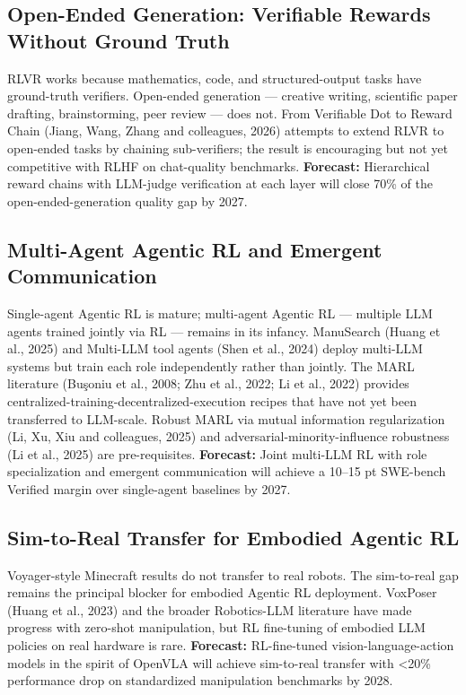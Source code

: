 \subsection{Open-Ended Generation: Verifiable Rewards Without Ground Truth}\label{open-ended-generation-verifiable-rewards-without-ground-truth}

RLVR works because mathematics, code, and structured-output tasks have ground-truth verifiers. Open-ended generation --- creative writing, scientific paper drafting, brainstorming, peer review --- does not. From Verifiable Dot to Reward Chain (Jiang, Wang, Zhang and colleagues, 2026) attempts to extend RLVR to open-ended tasks by chaining sub-verifiers; the result is encouraging but not yet competitive with RLHF on chat-quality benchmarks. \textbf{Forecast:} Hierarchical reward chains with LLM-judge verification at each layer will close 70\% of the open-ended-generation quality gap by 2027.

\subsection{Multi-Agent Agentic RL and Emergent Communication}\label{multi-agent-agentic-rl-and-emergent-communication}

Single-agent Agentic RL is mature; multi-agent Agentic RL --- multiple LLM agents trained jointly via RL --- remains in its infancy. ManuSearch (Huang et al., 2025) and Multi-LLM tool agents (Shen et al., 2024) deploy multi-LLM systems but train each role independently rather than jointly. The MARL literature (Buşoniu et al., 2008; Zhu et al., 2022; Li et al., 2022) provides centralized-training-decentralized-execution recipes that have not yet been transferred to LLM-scale. Robust MARL via mutual information regularization (Li, Xu, Xiu and colleagues, 2025) and adversarial-minority-influence robustness (Li et al., 2025) are pre-requisites. \textbf{Forecast:} Joint multi-LLM RL with role specialization and emergent communication will achieve a 10--15 pt SWE-bench Verified margin over single-agent baselines by 2027.

\subsection{Sim-to-Real Transfer for Embodied Agentic RL}\label{sim-to-real-transfer-for-embodied-agentic-rl}

Voyager-style Minecraft results do not transfer to real robots. The sim-to-real gap remains the principal blocker for embodied Agentic RL deployment. VoxPoser (Huang et al., 2023) and the broader Robotics-LLM literature have made progress with zero-shot manipulation, but RL fine-tuning of embodied LLM policies on real hardware is rare. \textbf{Forecast:} RL-fine-tuned vision-language-action models in the spirit of OpenVLA will achieve sim-to-real transfer with \textless20\% performance drop on standardized manipulation benchmarks by 2028.

